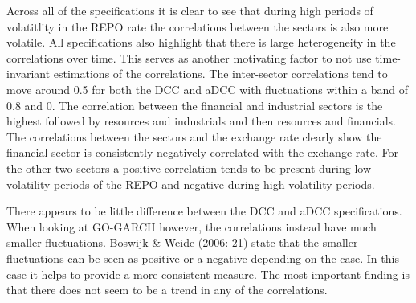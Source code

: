 \documentclass[12pt,preprint, authoryear]{elsarticle}
\numberwithin{equation}{section}
\numberwithin{figure}{section}
\numberwithin{table}{section}
\begin{document}
Across all of the specifications it is clear to see that during high
periods of volatitlity in the REPO rate the correlations between the
sectors is also more volatile. All specifications also highlight that
there is large heterogeneity in the correlations over time. This serves
as another motivating factor to not use time-invariant estimations of
the correlations. The inter-sector correlations tend to move around 0.5
for both the DCC and aDCC with fluctuations within a band of 0.8 and 0.
The correlation between the financial and industrial sectors is the
highest followed by resources and industrials and then resources and
financials. The correlations between the sectors and the exchange rate
clearly show the financial sector is consistently negatively correlated
with the exchange rate. For the other two sectors a positive correlation
tends to be present during low volatility periods of the REPO and
negative during high volatility periods.

There appears to be little difference between the DCC and aDCC
specifications. When looking at GO-GARCH however, the correlations
instead have much smaller fluctuations. Boswijk \& Weide
(\protect\hyperlink{ref-boswijk2006wake}{2006: 21}) state that the
smaller fluctuations can be seen as positive or a negative depending on
the case. In this case it helps to provide a more consistent measure.
The most important finding is that there does not seem to be a trend in
any of the correlations.
\end{document}
